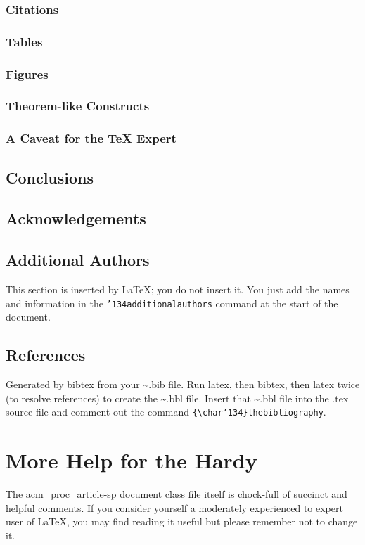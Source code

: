 \documentclass{acm_proc_article-sp}
\begin{document}
\subsubsection{Citations}
\label{sec-6-2-3}
\subsubsection{Tables}
\label{sec-6-2-4}
\subsubsection{Figures}
\label{sec-6-2-5}
\subsubsection{Theorem-like Constructs}
\label{sec-6-2-6}
\subsubsection{A Caveat for the \TeX{} Expert}
\label{sec-6-2-7}
\subsection{Conclusions}
\label{sec-6-3}
\subsection{Acknowledgements}
\label{sec-6-4}
\subsection{Additional Authors}
\label{sec-6-5}

This section is inserted by \LaTeX; you do not insert it.
You just add the names and information in the
\texttt{{\char'134}additionalauthors} command at the start
of the document.
\subsection{References}
\label{sec-6-6}

Generated by bibtex from your \~{}.bib file.  Run latex,
then bibtex, then latex twice (to resolve references)
to create the \~{}.bbl file.  Insert that \~{}.bbl file into
the .tex source file and comment out
the command \texttt{\{\textbackslash{}char'134\}thebibliography}.
\section{More Help for the Hardy}
\label{sec-7}

The acm\_proc\_article-sp document class file itself is chock-full of succinct
and helpful comments.  If you consider yourself a moderately
experienced to expert user of \LaTeX, you may find reading
it useful but please remember not to change it.

\balancecolumns
\end{document}
